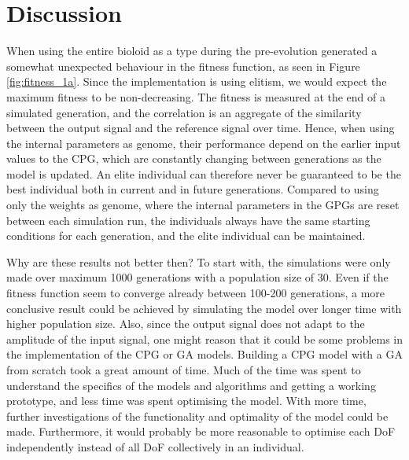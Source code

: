 \section{Discussion}
\label{discussionSec}

When using the entire bioloid as a type during the pre-evolution generated a somewhat unexpected behaviour in the fitness function, as seen in Figure \ref{fig:fitness_1a}. Since the implementation is using elitism, we would expect the maximum fitness to be non-decreasing. The fitness is measured at the end of a simulated generation, and the correlation is an aggregate of the similarity between the output signal and the reference signal over time. Hence, when using the internal parameters as genome, their performance depend on the earlier input values to the CPG, which are constantly changing between generations as the model is updated. An elite individual can therefore never be guaranteed to be the best individual both in current and in future generations. Compared to using only the weights as genome, where the internal parameters in the GPGs are reset between each simulation run, the individuals always have the same starting conditions for each generation, and the elite individual can be maintained.

Why are these results not better then? To start with, the simulations were only made over maximum 1000 generations with a population size of 30. Even if the fitness function seem to converge already between 100-200 generations, a more conclusive result could be achieved by simulating the model over longer time with higher population size. Also, since the output signal does not adapt to the amplitude of the input signal, one might reason that it could be some problems in the implementation of the CPG or GA models. Building a CPG model with a GA from scratch took a great amount of time. Much of the time was spent to understand the specifics of the models and algorithms and getting a working prototype, and less time was spent optimising the model. With more time, further investigations of the functionality and optimality of the model could be made. Furthermore, it would probably be more reasonable to optimise each DoF independently instead of all DoF collectively in an individual.

